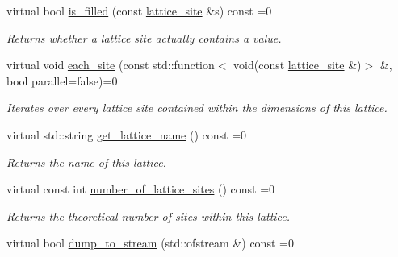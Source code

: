 \begin{DoxyCompactItemize}
virtual bool \hyperlink{classsisl_1_1base__lattice_a883cb05212eb7339bd73dd8ddf8968ca}{is\+\_\+filled} (const \hyperlink{namespacesisl_acd18feee4026583db6185df2b25434aa}{lattice\+\_\+site} \&s) const =0
\begin{DoxyCompactList}\small\item\em Returns whether a lattice site actually contains a value. \end{DoxyCompactList}\item 
\mbox{\label{classsisl_1_1base__lattice_a3ff5b00f3d8c41e59672e6fa76456ff9}} 
virtual void \hyperlink{classsisl_1_1base__lattice_a3ff5b00f3d8c41e59672e6fa76456ff9}{each\+\_\+site} (const std\+::function$<$ void(const \hyperlink{namespacesisl_acd18feee4026583db6185df2b25434aa}{lattice\+\_\+site} \&)$>$ \&, bool parallel=false)=0
\begin{DoxyCompactList}\small\item\em Iterates over every lattice site contained within the dimensions of this lattice. \end{DoxyCompactList}\item 
\mbox{\label{classsisl_1_1base__lattice_a663d4e3b07c524970848377b66de9425}} 
virtual std\+::string \hyperlink{classsisl_1_1base__lattice_a663d4e3b07c524970848377b66de9425}{get\+\_\+lattice\+\_\+name} () const =0
\begin{DoxyCompactList}\small\item\em Returns the name of this lattice. \end{DoxyCompactList}\item 
\mbox{\label{classsisl_1_1base__lattice_a57946d77d273c39cffba678241f4f8d3}} 
virtual const int \hyperlink{classsisl_1_1base__lattice_a57946d77d273c39cffba678241f4f8d3}{number\+\_\+of\+\_\+lattice\+\_\+sites} () const =0
\begin{DoxyCompactList}\small\item\em Returns the theoretical number of sites within this lattice. \end{DoxyCompactList}\item 
\mbox{\label{classsisl_1_1base__lattice_a78cf60c535a188fd07bbd4ae4379b7bd}} 
virtual bool \hyperlink{classsisl_1_1base__lattice_a78cf60c535a188fd07bbd4ae4379b7bd}{dump\+\_\+to\+\_\+stream} (std\+::ofstream \&) const =0

\end{DoxyCompactItemize}
